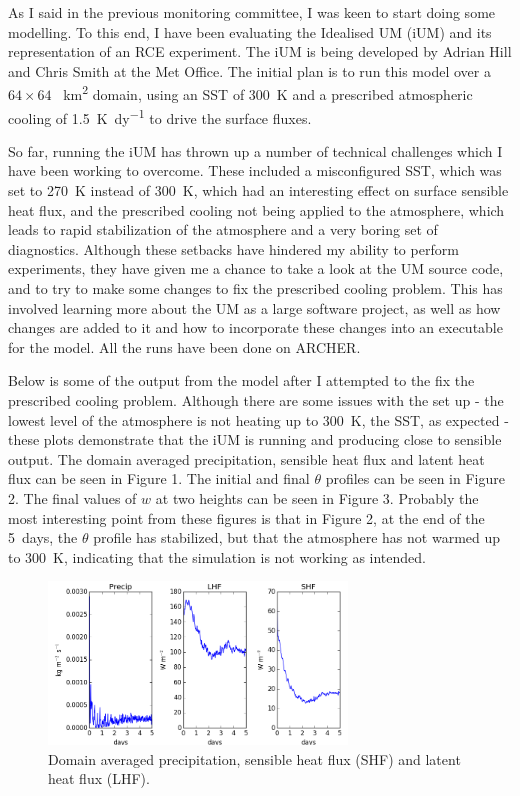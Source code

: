 \documentclass[11pt,a4paper]{article}
\begin{document}
As I said in the previous monitoring committee, I was keen to start doing some modelling. To this
end, I have been evaluating the Idealised UM (iUM) and its representation of an RCE experiment. The
iUM is being developed by Adrian Hill and Chris Smith at the Met Office. The initial plan is to run
this model over a $64\times64$ \SI{}{km^2} domain, using an SST of \SI{300}{K} and a prescribed atmospheric
cooling of \SI{1.5}{K dy^{-1}} to drive the surface fluxes.

So far, running the iUM has thrown up a number of technical challenges which I have been working to
overcome. These included a misconfigured SST, which was set to \SI{270}{K} instead of \SI{300}{K},
which had an interesting effect on surface sensible heat flux, and the prescribed cooling not being
applied to the atmosphere, which leads to rapid stabilization of the atmosphere and a very boring
set of diagnostics. Although these setbacks have hindered my ability to perform experiments, they
have given me a chance to take a look at the UM source code, and to try to make some changes to fix
the prescribed cooling problem. This has involved learning more about the UM as a large software
project, as well as how changes are added to it and how to incorporate these changes into an
executable for the model. All the runs have been done on ARCHER.

Below is some of the output from the model after I attempted to the fix the prescribed cooling
problem. Although there are some issues with the set up - the lowest level of the atmosphere is not
heating up to \SI{300}{K}, the SST, as expected - these plots demonstrate that the iUM is running
and producing close to sensible output. The domain averaged precipitation, sensible heat flux and
latent heat flux can be seen in Figure 1. The initial and final $\theta$ profiles can be seen in
Figure 2. The final values of $w$ at two heights can be seen in Figure 3. Probably the most
interesting point from these figures is that in Figure 2, at the end of the \SI{5}{days}, the
$\theta$ profile has stabilized, but that the atmosphere has not warmed up to \SI{300}{K},
indicating that the simulation is not working as intended.

\begin{figure}[hbp!]
    \centering
    \includegraphics[width=300px]{figures/figure_precip_lhf_shf}
    \caption{Domain averaged precipitation, sensible heat flux (SHF) and latent heat flux (LHF).}
    \label{fig:precip}
\end{figure}
\end{document}
